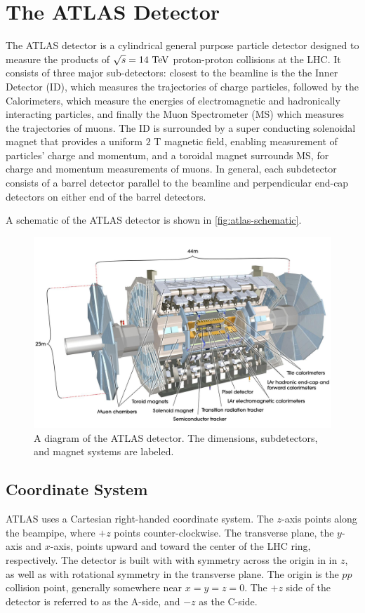 \chapter{The ATLAS Detector}

The \ac{ATLAS} detector is a cylindrical general purpose particle detector designed to measure the products of $\sqrt{s} = 14 \TeV$ proton-proton collisions at the \ac{LHC}. It consists of three major sub-detectors: closest to the beamline is the the Inner Detector (ID), which measures the trajectories of charge particles, followed by the Calorimeters, which measure the energies of electromagnetic and hadronically interacting particles, and finally the Muon Spectrometer (MS) which measures the trajectories of muons. The \ac{ID} is surrounded by a super conducting solenoidal magnet that provides a uniform $2$ T magnetic field, enabling measurement of particles' charge and momentum, and a toroidal magnet surrounds \ac{MS}, for charge and momentum measurements of muons. In general, each subdetector consists of a barrel detector parallel to the beamline and perpendicular end-cap detectors on either end of the barrel detectors. \cite{atlas-overview}

A schematic of the \ac{ATLAS} detector is shown in \autoref{fig:atlas-schematic}.


\begin{figure}[htbp]
\centering
\includegraphics[width=.8\textwidth]{figures/Detector/atlas-schematic.jpg}
\caption{A diagram of the \ac{ATLAS} detector. The dimensions, subdetectors, and magnet systems are labeled. }
\label{fig:atlas-schematic}
\end{figure}

\section{Coordinate System}
\ac{ATLAS} uses a Cartesian right-handed coordinate system. The $z$-axis points along the beampipe, where $+z$ points counter-clockwise. The transverse plane, the $y$-axis and $x$-axis, points upward and toward the center of the \ac{LHC} ring, respectively. The detector is built with with symmetry across the origin in in $z$, as well as with rotational symmetry in the transverse plane. The origin is the $pp$ collision point, generally somewhere near $x=y=z=0$. The $+z$ side of the detector is referred to as the A-side, and $-z$ as the C-side. 

